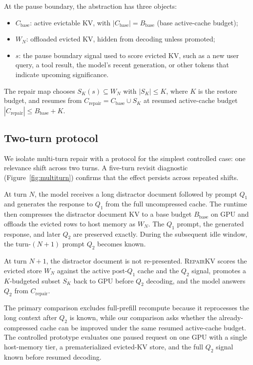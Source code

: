 \documentclass{article}
\newcommand{\repairkv}{\textsc{RepairKV}}
\newcommand{\bbase}{\ensuremath{B_{\mathrm{base}}}}
\begin{document}
At the pause boundary, the abstraction has three objects:
\begin{itemize}[leftmargin=1.4em,noitemsep,topsep=2pt]
  \item $C_{\mathrm{base}}$: active evictable KV, with
  $|C_{\mathrm{base}}|=\bbase$ (base active-cache budget);
  \item $W_N$: offloaded evicted KV, hidden from decoding unless promoted; 
  \item $s$: {\color{red}the pause boundary signal used to score evicted KV,} such as a new user
  query, a tool result, the model's recent generation, or other tokens
  that {\color{red}indicate upcoming significance.}
\end{itemize}
{\color{red}The repair map chooses $S_K(s)\subseteq W_N$ with
$|S_K|\le K$, where $K$ is the restore budget}, and resumes from
$C_{\mathrm{repair}}=C_{\mathrm{base}}\cup S_K$ at resumed
active-cache budget $|C_{\mathrm{repair}}|\le \bbase+K$. 

\subsection{Two-turn protocol}
{\color{red}We isolate multi-turn repair with a protocol for the simplest controlled case: one relevance shift across two turns. A five-turn revisit diagnostic (Figure~\ref{fig:multiturn}) confirms that the effect persists across repeated shifts.}

At turn $N$, the model receives a long distractor document followed by prompt $Q_1$ and generates the response to $Q_1$ from the full uncompressed cache. The runtime then compresses the distractor document KV to a base budget $\bbase$ on GPU and offloads the evicted rows to host memory as $W_N$. The $Q_1$ prompt, the generated response, and later $Q_2$ are preserved exactly. During the subsequent idle window, the turn-$(N{+}1)$ prompt $Q_2$ becomes known.

At turn $N{+}1$, the distractor document is not re-presented. \repairkv{} scores the evicted store $W_N$ against the active post-$Q_1$ cache and the $Q_2$ signal, promotes a $K$-budgeted subset $S_K$ back to GPU before $Q_2$ decoding, and the model answers $Q_2$ from $C_{\mathrm{repair}}$.

The primary comparison excludes full-prefill recompute because it reprocesses the long context after $Q_2$ is known, while our comparison asks whether the already-compressed cache can be improved under the same resumed active-cache budget. The controlled prototype evaluates one paused request on one GPU with a single host-memory tier, a prematerialized evicted-KV store, and the full $Q_2$ signal known before resumed decoding.
\end{document}
